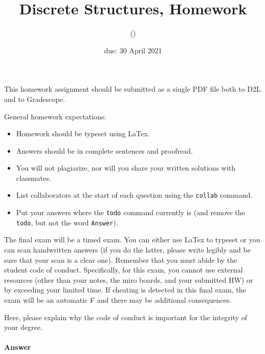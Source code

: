 \documentclass{article}
\title{Discrete Structures, Homework \hwnum}
\author{\todo{Your Name Here} (\todo{your discord handle here})}
\date{due: 30 April 2021}
\begin{document}
\maketitle

This homework assignment should be
submitted as a single PDF file both to D2L and to Gradescope.

General homework expectations:
\begin{itemize}
    \item Homework should be typeset using LaTex.
    \item Answers should be in complete sentences and proofread.
    \item You will not plagiarize, nor will you share your written solutions
        with classmates.
    \item List collaborators at the start of each question using the \texttt{collab} command.
    \item Put your answers where the \texttt{todo} command currently is (and
        remove the \texttt{todo}, but not the word \texttt{Answer}).
\end{itemize}


\collab{\todo{}} 

The final exam will be a timed exam.  You can either use LaTex to typeset or you
can scan handwritten answers (if you do the latter, please write legibly and be
sure that your scan is a clear one).  Remember that you must abide by the
student code of conduct.  Specifically, for this exam, you cannot use external
resources (other than your notes, the miro boards, and your submitted HW) or by
exceeding your limited time.  If cheating is detected in this final exam, the
exam will be an automatic F and there may be additional consequences.

Here, please explain why the code of conduct is important for the integrity of
your degree.

\paragraph{Answer}




 
\end{document}
